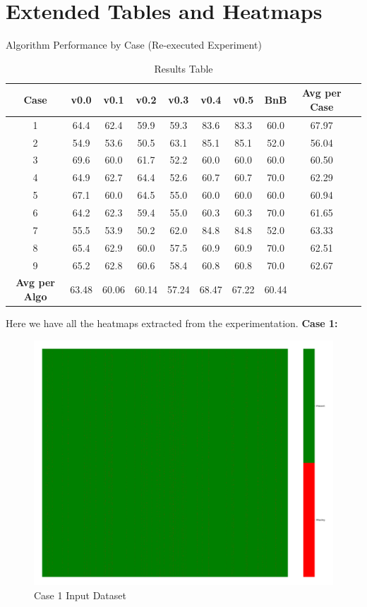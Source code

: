 \documentclass[a4paper,12pt]{article}
\begin{document}
\section{Extended Tables and Heatmaps}
\begin{table}[h]
\centering
\caption{Algorithm Performance by Case (Re-executed Experiment)}
\label{tab:rescores}
\begin{tabular}{|c|c|c|c|c|c|c|c|c|c|}
\hline
\textbf{Case} & \textbf{v0.0} & \textbf{v0.1} & \textbf{v0.2} & \textbf{v0.3} & \textbf{v0.4} & \textbf{v0.5} & \textbf{BnB} & \textbf{Avg per Case} \\
\hline
1 & 64.4 & 62.4 & 59.9 & 59.3 & 83.6 & 83.3 & 60.0 & 67.97 \\
2 & 54.9 & 53.6 & 50.5 & 63.1 & 85.1 & 85.1 & 52.0 & 56.04 \\
3 & 69.6 & 60.0 & 61.7 & 52.2 & 60.0 & 60.0 & 60.0 & 60.50 \\
4 & 64.9 & 62.7 & 64.4 & 52.6 & 60.7 & 60.7 & 70.0 & 62.29 \\
5 & 67.1 & 60.0 & 64.5 & 55.0 & 60.0 & 60.0 & 60.0 & 60.94 \\
6 & 64.2 & 62.3 & 59.4 & 55.0 & 60.3 & 60.3 & 70.0 & 61.65 \\
7 & 55.5 & 53.9 & 50.2 & 62.0 & 84.8 & 84.8 & 52.0 & 63.33 \\
8 & 65.4 & 62.9 & 60.0 & 57.5 & 60.9 & 60.9 & 70.0 & 62.51 \\
9 & 65.2 & 62.8 & 60.6 & 58.4 & 60.8 & 60.8 & 70.0 & 62.67 \\
\hline
\textbf{Avg per Algo} & 63.48 & 60.06 & 60.14 & 57.24 & 68.47 & 67.22 & 60.44 & \\
\hline
\end{tabular}
\caption*{Results Table}
\end{table}

Here we have all the heatmaps extracted from the experimentation. 
\textbf{Case 1:}
\begin{figure}[H]
    \centering
    \includegraphics[width=\linewidth]{case1_heatmap_erased.png}
    \caption{Case 1 Input Dataset}
\end{figure}
\end{document}
